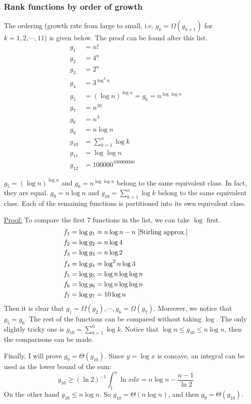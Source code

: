 \documentclass{article}
\begin{document}
\subsubsection{Rank functions by order of growth}
The ordering (growth rate from large to small, i.e. $g_k=\Omega(g_{k+1})$ for $k=1,2,\cdots,11$) is given below. The proof can be found after this list.
\begin{align*}
g_1&=n!\\
g_2&=4^n\\
g_3&=2^n\\
g_4&=3^{\log^2n}\\
g_5&=(\log n)^{\log n}=g_6=n^{\log\log n}\\
g_7&=n^{10}\\
g_8&=n^3\\
g_9&=n\log n\\
g_{10}&=\sum_{k=1}^n\log k\\
g_{11}&=\log\log n\\
g_{12}&=100000^{100000000}
\end{align*}

$g_5=(\log n)^{\log n}$ and $g_6=n^{\log\log n}$ belong to the same equivalent class. In fact, they are equal. $g_9=n\log n$ and $g_{10}=\sum_{k=1}^n\log k$ belong to the same equivalent class. Each of the remaining functions is partitioned into its own equivalent class.

\noindent\underline{Proof:} To compare the first 7 functions in the list, we can take $\log$ first.
\begin{align*}
f_1&=\log{g_1}\approx n\log n-n\textup{ [Stirling approx.]}\\
f_2&=\log{g_2}=n\log 4\\
f_3&=\log{g_3}=n\log 2\\
f_4&=\log{g_4}=\log^2n\log 3\\
f_5&=\log{g_5}=\log{n}\log\log{n}\\
f_6&=\log{g_6}=\log{n}\log\log{n}\\
f_7&=\log{g_7}=10\log n
\end{align*}
Then it is clear that $g_1=\Omega(g_2),\cdots,g_6=\Omega(g_7)$. Moreover, we notice that $g_5=g_6$. The rest of the functions can be compared without taking $\log$. The only slightly tricky one is $g_{10}=\sum_{k=1}^n\log k$. Notice that $\log n\leqslant g_{10}\leqslant n\log n$, then the comparisons can be made.

Finally, I will prove $g_9=\Theta(g_{10})$. Since $y=\log x$ is concave, an integral can be used as the lower bound of the sum:
\begin{equation*}
g_{10}\geqslant(\ln 2)^{-1}\int_1^n\ln xdx=n\log n-\frac{n-1}{\ln 2}
\end{equation*}
On the other hand $g_{10}\leqslant n\log n$. So $g_{10}=\Theta(n\log n)$, and then $g_9=\Theta(g_{10})$.
\end{document}
